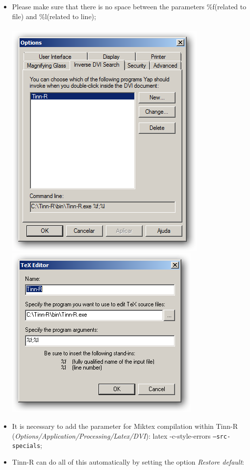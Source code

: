 \begin{itemize}
    \begin{itemize}
      \item Please make sure that there is no space between the
        parameters \%f(related to file) and \%l(related to line);\\\\
        \includegraphics[scale=0.50]{./res/yap_01.png}~~
        \includegraphics[scale=0.50]{./res/yap_02.png}\\
      \item It is necessary to add the parameter for Miktex compilation
        within Tinn-R (\textit{Options/Application/Processing/Latex/DVI}):
        latex -c-style-errors \texttt{--src-specials};
      \item Tinn-R can do all of this automatically by setting the
        option \textit{Restore default}:


\end{itemize}
\end{itemize}
